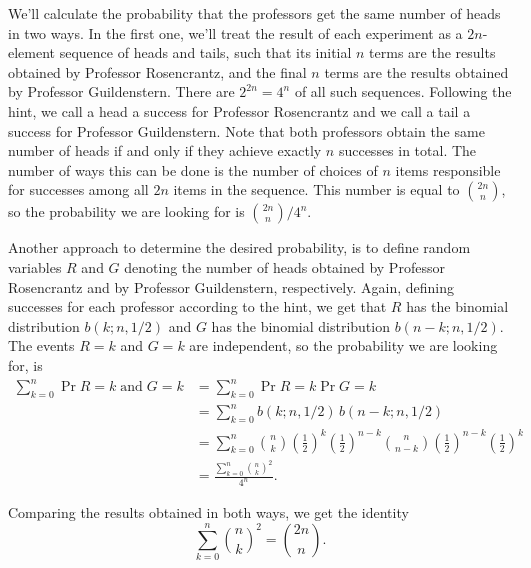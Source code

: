 We'll calculate the probability that the professors get the same number of heads in two ways.
In the first one, we'll treat the result of each experiment as a $2n$-element sequence of heads and tails, such that its initial $n$ terms are the results obtained by Professor Rosencrantz, and the final $n$ terms are the results obtained by Professor Guildenstern.
There are $2^{2n}=4^n$ of all such sequences.
Following the hint, we call a head a success for Professor Rosencrantz and we call a tail a success for Professor Guildenstern.
Note that both professors obtain the same number of heads if and only if they achieve exactly $n$ successes in total.
The number of ways this can be done is the number of choices of $n$ items responsible for successes among all $2n$ items in the sequence.
This number is equal to $\binom{2n}{n}$, so the probability we are looking for is $\binom{2n}{n}/4^n$.

Another approach to determine the desired probability, is to define random variables $R$ and $G$ denoting the number of heads obtained by Professor Rosencrantz and by Professor Guildenstern, respectively.
Again, defining successes for each professor according to the hint, we get that $R$ has the binomial distribution $b(k;n,1/2)$ and $G$ has the binomial distribution $b(n-k;n,1/2)$.
The events $R=k$ and $G=k$ are independent, so the probability we are looking for, is
\begin{align*}
    \sum_{k=0}^n\Pr{R=k\;\text{and}\;G=k} &= \sum_{k=0}^n\Pr{R=k}\Pr{G=k} \\
    &= \sum_{k=0}^nb(k;n,1/2)\,b(n-k;n,1/2) \\
    &= \sum_{k=0}^n\binom{n}{k}\left(\frac{1}{2}\right)^k\left(\frac{1}{2}\right)^{n-k}\binom{n}{n-k}\left(\frac{1}{2}\right)^{n-k}\left(\frac{1}{2}\right)^k \\
    &= \frac{\sum_{k=0}^n\binom{n}{k}^2}{4^n}.
\end{align*}

Comparing the results obtained in both ways, we get the identity
\[
    \sum_{k=0}^n\binom{n}{k}^2 = \binom{2n}{n}.
\]
